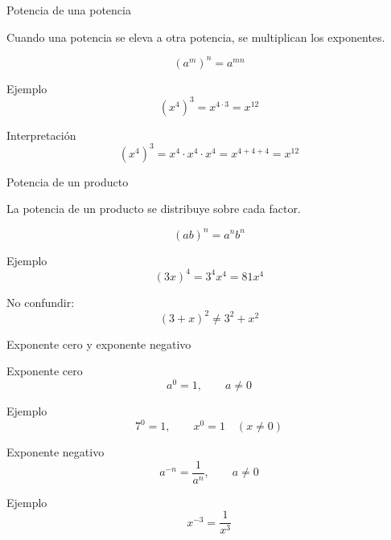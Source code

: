 \documentclass[handout,aspectratio=169]{beamer}
\begin{document}
	\begin{frame}{Potencia de una potencia}
		\begin{idea}
			Cuando una potencia se eleva a otra potencia, se multiplican los exponentes.
		\end{idea}
		
		\[
		(a^m)^n=a^{mn}
		\]
		
		\pause
		
		\begin{exampleblock}{Ejemplo}
			\[
			(x^4)^3=x^{4\cdot 3}=x^{12}
			\]
		\end{exampleblock}
		
		\pause
		
		\begin{block}{Interpretación}
			\[
			(x^4)^3=x^4\cdot x^4\cdot x^4=x^{4+4+4}=x^{12}
			\]
		\end{block}
	\end{frame}
	
	\begin{frame}{Potencia de un producto}
		\begin{idea}
			La potencia de un producto se distribuye sobre cada factor.
		\end{idea}
		
		\[
		(ab)^n=a^n b^n
		\]
		
		\pause
		
		\begin{exampleblock}{Ejemplo}
			\[
			(3x)^4=3^4x^4=81x^4
			\]
		\end{exampleblock}
		
		\pause
		
		\begin{alerta}
			No confundir:
			\[
			(3+x)^2 \neq 3^2+x^2
			\]
		\end{alerta}
	\end{frame}
	
	\begin{frame}{Exponente cero y exponente negativo}
		\begin{block}{Exponente cero}
			\[
			a^0=1,
			\qquad a\neq 0
			\]
		\end{block}
		
		\pause
		
		\begin{exampleblock}{Ejemplo}
			\[
			7^0=1,\qquad x^0=1\quad (x\neq 0)
			\]
		\end{exampleblock}
		
		\pause
		
		\begin{block}{Exponente negativo}
			\[
			a^{-n}=\frac{1}{a^n},
			\qquad a\neq 0
			\]
		\end{block}
		
		\pause
		
		\begin{exampleblock}{Ejemplo}
			\[
			x^{-3}=\frac{1}{x^3}
			\]
		\end{exampleblock}
	\end{frame}
	
\end{document}
